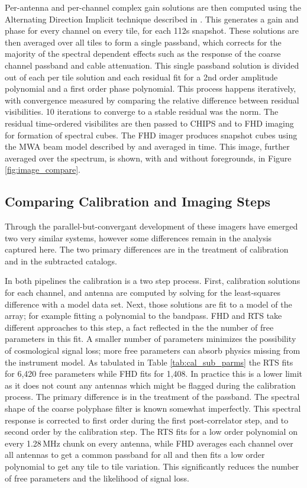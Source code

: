 \documentclass[preprint2]{aastex}
\begin{document}
 Per-antenna and per-channel complex gain solutions are then computed using the Alternating Direction Implicit technique described in \citet{sal14}.  This generates a gain and phase for every channel on every tile, for each 112s snapshot.  These solutions are then averaged over all tiles to form a single passband, which corrects for the majority of the spectral dependent effects such as the response of the coarse channel passband and cable attenuation.  This single passband solution is divided out of each per tile solution and each residual fit for a 2nd order amplitude polynomial and a first order phase polynomial. This process happens iteratively, with convergence measured by comparing the relative difference between residual visibilities. 10 iterations to converge to a stable residual was the norm.  The residual time-ordered visibilites are then passed to CHIPS and to FHD imaging for formation of spectral cubes.  The FHD imager  produces snapshot cubes using the MWA beam model described by \cite{Sutinjo:2015RaSc...50...52S} and averaged in time. This image, further averaged over the spectrum, is shown, with and without foregrounds, in Figure \ref{fig:image_compare}.

\subsection{Comparing Calibration and Imaging Steps}
\label{sec:comparing_imaging}
Through the parallel-but-convergant development of these imagers have emerged two very similar systems, however some differences remain in the analysis captured here. The two primary differences are in the treatment of calibration and in the subtracted catalogs.  

In both pipelines the calibration is a two step process. First, calibration solutions for each channel, and antenna are computed by solving for the least-squares difference with a model data set. Next, those solutions are fit to a model of the array; for example fitting a polynomial to the bandpass. FHD and RTS take different approaches to this step, a fact reflected in the the number of free parameters in this fit. A smaller number of parameters minimizes the possibility of cosmological signal loss; more free parameters can absorb physics missing from the instrument model.  As tabulated in Table \ref{tab:cal_sub_parms} the RTS fits for 6,420 free parameters while FHD fits for 1,408.  In practice this is a lower limit as it does not count any antennas which might be flagged during the calibration process. The primary difference is in the treatment of the passband.  The spectral shape of the coarse polyphase filter is known somewhat imperfectly. This spectral response is corrected to first order during the first post-correlator step, and to second order by the calibration step. The RTS fits for a low order polynomial on every 1.28\,MHz chunk on every antenna, while FHD averages each channel over all antennas to get a common passband for all and then fits a low order polynomial to get any tile to tile variation. This significantly reduces the number of free parameters and the likelihood of signal loss.
\end{document}
